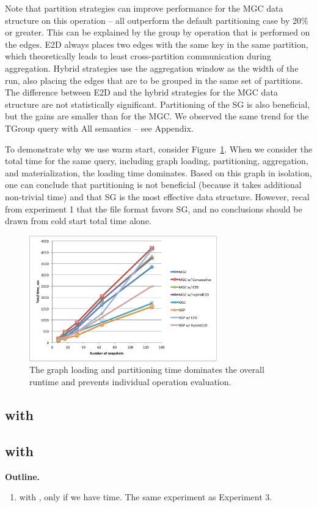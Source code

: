 Note that partition strategies can improve performance for the MGC
data structure on this operation -- all outperform the default
partitioning case by 20\% or greater.  This can be explained by the
group by operation that is performed on the edges.  E2D always places
two edges with the same key in the same partition, which theoretically
leads to least cross-partition communication during aggregation.
Hybrid strategies use the aggregation window as the width of the run,
also placing the edges that are to be grouped in the same set of
partitions.  The difference between E2D and the hybrid strategies for
the MGC data structure are not statistically significant.
Partitioning of the SG is also beneficial, but the gains are smaller
than for the MGC.  We observed the same trend for the TGroup query
with All semantics -- see Appendix.

To demonstrate why we use warm start, consider
Figure~\ref{fig:tgroupe_cold}.  When we consider the total time for
the same query, including graph loading, partitioning, aggregation,
and materialization, the loading time dominates.  Based on this graph
in isolation, one can conclude that partitioning is not beneficial
(because it takes additional non-trivial time) and that SG is the most
effective data structure.  However, recal from experiment 1 that the
file format favors SG, and no conclusions should be drawn from cold
start total time alone.

\begin{figure}[t!]
\includegraphics[width=3.2in]{figs/tgroupe_cold.pdf}
\caption{The graph loading and partitioning time dominates the overall
  runtime and prevents individual operation evaluation.}
\label{fig:tgroupe_cold}
\end{figure}


\subsection{ with }

\subsection{ with }

{\bf Outline.}

\begin{enumerate}

\item {} with , only if we have time. The
  same experiment as Experiment 3.

\end{enumerate}
